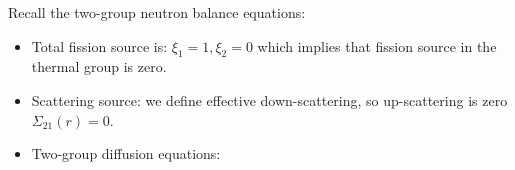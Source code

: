 \documentclass{school-22.211-notes}
\date{April  2, 2012}
\begin{document}
\maketitle

Recall the two-group neutron balance equations:
\begin{itemize}
\item Total fission source is: 
  $\xi_1 = 1, \xi_2 = 0$ which implies that fission source in the thermal group is zero.
\item Scattering source: we define effective down-scattering, so up-scattering is zero $\Sigma_{21}(r) = 0$. 
\item Two-group diffusion equations: 
\end{itemize}
\end{document}
